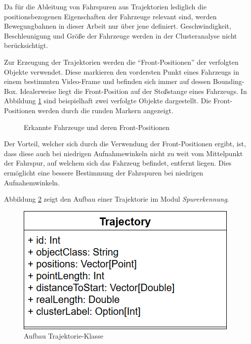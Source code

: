 Da für die Ableitung von Fahrspuren aus Trajektorien lediglich die positionsbezogenen Eigenschaften
der Fahrzeuge relevant sind, werden Bewegungbahnen in dieser Arbeit nur über jene definiert.
Geschwindigkeit, Beschleunigung und Größe der Fahrzeuge werden in der Clusteranalyse nicht berücksichtigt.

Zur Erzeugung der Trajektorien werden die ``Front-Positionen'' der verfolgten Objekte verwendet. Diese markieren den
vordersten Punkt eines Fahrzeugs in einem bestimmten Video-Frame und befinden sich immer auf dessen Bounding-Box.
Idealerweise liegt die Front-Position auf der Stoßstange eines Fahrzeugs. In Abbildung \ref{fig:real1_tracked_object_front_position}
sind beispielhaft zwei verfolgte Objekte dargestellt. Die Front-Positionen werden durch die runden Markern angezeigt.

\begin{figure}[H]
    \centering
    \qquad \qquad
    \caption{Erkannte Fahrzeuge und deren Front-Positionen}
    \label{fig:real1_tracked_object_front_position}
\end{figure}

Der Vorteil, welcher sich durch die Verwendung der Front-Positionen ergibt, ist, dass diese auch bei niedrigen
Aufnahmewinkeln nicht zu weit vom Mittelpunkt der Fahrspur, auf welchem sich das Fahrzeug befindet, entfernt liegen.
Dies ermöglicht eine bessere Bestimmung der Fahrspuren bei niedrigen Aufnahemwinkeln.

Abbildung \ref{fig:real_trajectory_classDia} zeigt den Aufbau einer Trajektorie im Modul \textit{Spurerkennung}.

\begin{figure}[H]
\centering
    \includegraphics[width=0.38\linewidth]{resources/img/umsetzung/U1/Trajectory_ClassDia}
\caption{Aufbau Trajektorie-Klasse}
\label{fig:real_trajectory_classDia}
\end{figure}

